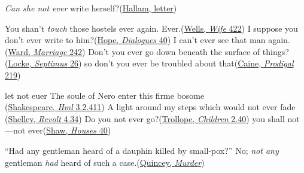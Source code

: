 \ea \label{ex:05-26}
\textit{Can she not ever} write herself?\hfill(\href{https://archive.org/details/alfredlordtenny05tenngoog/page/n250/mode/2up?q=%22can+she+not+ever%22&view=theater}{Hallam, letter})
\z

\ea \label{ex:05-27}
\ea
You shan't \textit{touch} those hostels ever again. Ever.\hfill(\href{https://archive.org/details/wifeofsirisaacha00well/page/422/mode/2up?view=theater&q=%22touch+those+hostels%22}{Wells, \textit{Wife} 422})
\ex
I suppose you don't ever write to him?\hfill(\href{https://archive.org/details/dollydialogues00hope_0/page/62/mode/2up?view=theater&q=%22ever+write+to+him%22}{Hope, \textit{Dialogues} 40})
\ex
I can't ever see that man again.\hfill(\href{https://archive.org/details/marriageofwillia0000mrsh_i0u5/page/284/mode/2up?q=%22can%27t+ever+see+that+man+again%22&view=theater}{Ward, \textit{Marriage} 242})
\ex
Don't you ever go down beneath the surface of things?\\\hfill(\href{https://archive.org/details/septimus00unkngoog/page/n253/mode/2up?q=%22you+ever+go+down%22&view=theater}{Locke, \textit{Septimus} 26})
\ex
so don't you ever be troubled about that\hfill(\href{https://archive.org/details/prodigalson00caingoog/page/n222/mode/2up?view=theater&q=%22don%27t+you+ever+be+troubled%22}{Caine, \textit{Prodigal} 219})
\z
\z

\ea \label{ex:05-27a}
\ea
let not euer The soule of Nero enter this firme bosome\\\hfill(\href{https://internetshakespeare.uvic.ca/doc/Ham_F1/scene/3.2/index.html#tln-2260}{Shakespeare, \textit{Hml} 3.2.411})
\ex
A light around my steps which would not ever fade\\\hfill(\href{https://archive.org/details/completepoeticalshel/page/78/mode/2up?view=theater&q=%22light+around+my+steps%22}{Shelley, \textit{Revolt} 4.34})
\ex
Do you not ever go?\hfill(\href{https://archive.org/details/dukeschildrennov00troluoft/page/172/mode/2up?q=%22do+you+not+ever%22&view=theater}{Trollope, \textit{Children} 2.40})
\ex
you shall not---not ever\hfill(\href{https://archive.org/details/widowershousesun00shaw/page/42/mode/2up?q=%22you+shall+not%22&view=theater}{Shaw, \textit{Houses} 40})
\z
\z{}

\ea \label{ex:05-36}
``Had any gentleman heard of a dauphin killed by small-pox?'' No; \textit{not any} gentleman \textit{had} heard of such a case.\hfill(\href{https://archive.org/details/miscellaneousess00dequuoft/page/78/mode/2up?q=%22heard+of+a+dauphin%22&view=theater}{Quincey, \textit{Murder}}) %
\z

